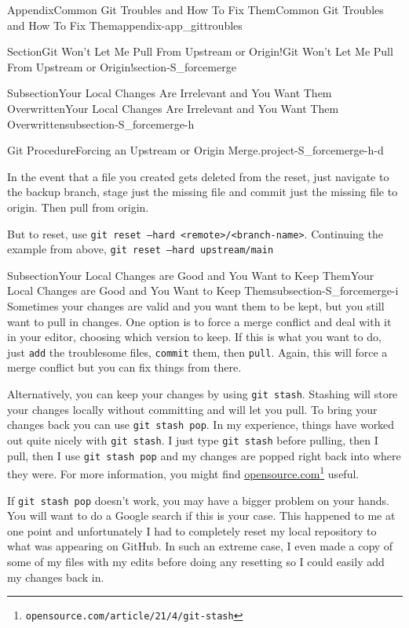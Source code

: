 \documentclass[oneside,10pt,]{book}
\newcommand{\mono}[1]{\texttt{#1}}
\begin{document}
\begin{appendixptx}{Appendix}{Common Git Troubles and How To Fix Them}{}{Common Git Troubles and How To Fix Them}{}{}{appendix-app_gittroubles}
\begin{sectionptx}{Section}{Git Won't Let Me Pull From Upstream or Origin!}{}{Git Won't Let Me Pull From Upstream or Origin!}{}{}{section-S_forcemerge}
\begin{subsectionptx}{Subsection}{Your Local Changes Are Irrelevant and You Want Them Overwritten}{}{Your Local Changes Are Irrelevant and You Want Them Overwritten}{}{}{subsection-S_forcemerge-h}
\begin{project}{Git Procedure}{Forcing an Upstream or Origin Merge.}{project-S_forcemerge-h-d}
\begin{enumerate}[font=\bfseries,label=(\alph*),ref=\alph*]
\par
In the event that a file you created gets deleted from the reset, just navigate to the backup branch, stage just the missing file and commit just the missing file to origin. Then pull from origin.%
\par
But to reset, use \mono{git reset --hard <remote>/<branch-name>}. Continuing the example from above, \mono{git reset --hard upstream/main}%
\end{enumerate}%
\end{project}%
\end{subsectionptx}
%
%
\typeout{************************************************}
\typeout{************************************************}
%
\begin{subsectionptx}{Subsection}{Your Local Changes are Good and You Want to Keep Them}{}{Your Local Changes are Good and You Want to Keep Them}{}{}{subsection-S_forcemerge-i}
%
%
Sometimes your changes are valid and you want them to be kept, but you still want to pull in changes. One option is to force a merge conflict and deal with it in your editor, choosing which version to keep. If this is what you want to do, just \mono{add} the troublesome files, \mono{commit} them, then \mono{pull}. Again, this will force a merge conflict but you can fix things from there.%
\par
Alternatively, you can keep your changes by using \mono{git stash}. Stashing will store your changes locally without committing and will let you pull. To bring your changes back you can use \mono{git stash pop}. In my experience, things have worked out quite nicely with \mono{git stash}. I just type \mono{git stash} before pulling, then I pull, then I use \mono{git stash pop} and my changes are popped right back into where they were. For more information, you might find \href{https://opensource.com/article/21/4/git-stash}{opensource.com}\footnote{\nolinkurl{opensource.com/article/21/4/git-stash}\label{fn-S_forcemerge-i-e-g}} useful.%
\par
If \mono{git stash pop} doesn't work, you may have a bigger problem on your hands. You will want to do a Google search if this is your case. This happened to me at one point and unfortunately I had to completely reset my local repository to what was appearing on GitHub. In such an extreme case, I even made a copy of some of my files with my edits before doing any resetting so I could easily add my changes back in.%
\end{subsectionptx}

\end{sectionptx}
\end{appendixptx}
\end{document}
